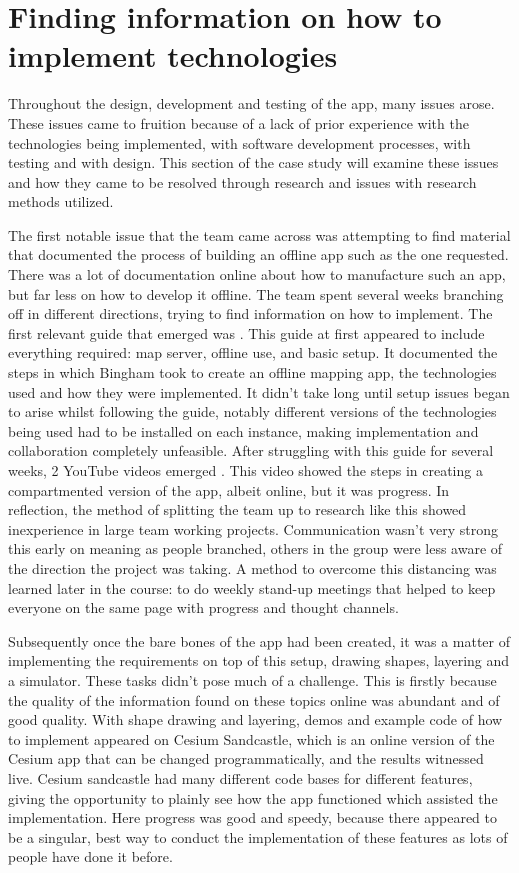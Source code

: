 \documentclass{l3proj}
\begin{document}
\section{Finding information on how to implement technologies}
Throughout the design, development and testing of the app, many issues arose.  These issues came to fruition because of a lack of prior experience with the technologies being implemented, with software development processes, with testing and with design.  This section of the case study will examine these issues and how they came to be resolved through research and issues with research methods utilized. \par
The first notable issue that the team came across was attempting to find material that documented the process of building an offline app such as the one requested.  There was a lot of documentation online about how to manufacture such an app, but far less on how to develop it offline.  The team spent several weeks branching off in different directions, trying to find information on how to implement.  The first relevant guide that emerged was \cite{DaleBingham}.  This guide at first appeared to include everything required: map server, offline use, and basic setup.  It documented the steps in which Bingham took to create an offline mapping app, the technologies used and how they were implemented.  It didn't take long until setup issues began to arise whilst following the guide, notably different versions of the technologies being used had to be installed on each instance, making implementation and collaboration completely unfeasible.  After struggling with this guide for several weeks, 2 YouTube videos emerged \cite{OpenGeoLab} \cite{WebGISDev}.  This video showed the steps in creating a compartmented version of the app, albeit online, but it was progress.  In reflection, the method of splitting the team up to research like this showed inexperience in large team working projects.  Communication wasn't very strong this early on meaning as people branched, others in the group were less aware of the direction the project was taking.  A method to overcome this distancing was learned later in the course: to do weekly stand-up meetings that helped to keep everyone on the same page with progress and thought channels. \par
Subsequently once the bare bones of the app had been created, it was a matter of implementing the requirements on top of this setup, drawing shapes, layering and a simulator.  These tasks didn’t pose much of a challenge.  This is firstly because the quality of the information found on these topics online was abundant and of good quality.  With shape drawing and layering, demos and example code of how to implement appeared on Cesium Sandcastle\cite{CesiumSandcastle}, which is an online version of the Cesium app that can be changed programmatically, and the results witnessed live.  Cesium sandcastle had many different code bases for different features, giving the opportunity to plainly see how the app functioned which assisted the implementation.  Here progress was good and speedy, because there appeared to be a singular, best way to conduct the implementation of these features as lots of people have done it before.\par
\end{document}
